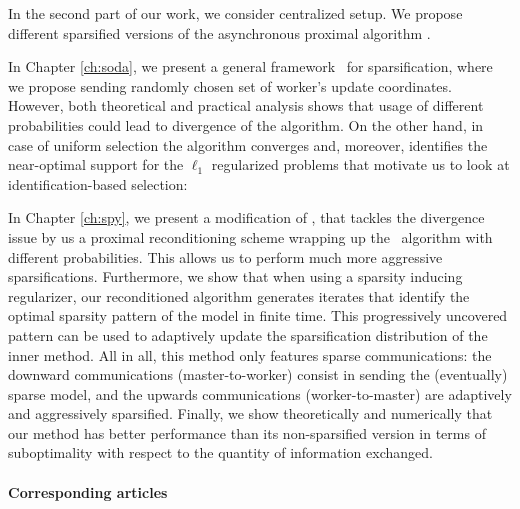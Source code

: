 In the second part of our work, we consider  centralized setup. We propose different sparsified versions of the asynchronous proximal algorithm \cite{mishchenko2018}.

In Chapter \ref{ch:soda}, we present a general framework \spy~for sparsification, where we propose sending randomly chosen set of worker's update coordinates. However, both theoretical and practical analysis shows that usage of different probabilities could lead to divergence of the algorithm. On the other hand, in case of uniform selection%
the algorithm converges and, moreover, identifies the near-optimal support for the $\ell_1$ regularized problems that motivate us to look at identification-based selection: 

In Chapter \ref{ch:spy}, we present a modification of \spy, that tackles the divergence issue by us a proximal reconditioning scheme wrapping up the \spy~algorithm with different probabilities. This allows us to perform much more
aggressive sparsifications. Furthermore, we show that when using a sparsity inducing regularizer, our reconditioned algorithm generates iterates that identify the optimal sparsity pattern
of the model in finite time. This progressively uncovered pattern can be used to adaptively update the sparsification distribution of the inner method. All in all, this method only features sparse communications: the downward communications (master-to-worker) consist in sending the (eventually) sparse model, and the upwards communications (worker-to-master) are adaptively and aggressively sparsified. Finally, we show theoretically and numerically that our method has better performance than its non-sparsified version in terms of suboptimality with respect to the quantity of information exchanged.

\paragraph{Corresponding articles}

